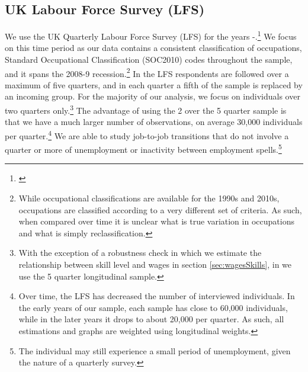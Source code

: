 \documentclass[preprint,12pt,authoryear]{elsarticle}
\begin{document}
\subsection{UK Labour Force Survey (LFS)}
\label{sec:LFS}
We use the UK Quarterly Labour Force Survey (LFS) for the years \hspace{-1mm}-\hspace{5mm}\hspace{-1mm}.\footnote{\cite{LFS}} We focus on this time period as our data contains a consistent classification of occupations, Standard Occupational Classification (SOC2010) codes throughout the sample, and it spans the 2008-9 recession.\footnote{While occupational classifications are available for the 1990s and 2010s, occupations are classified according to a very different set of criteria. As such, when compared over time it is unclear what is true variation in occupations and what is simply reclassification.}  In the LFS respondents are followed over a maximum of five quarters, and in each quarter a fifth of the sample is replaced by an incoming group. For the majority of our analysis, we focus on individuals over two quarters only.\footnote{With the exception of a robustness check in which we estimate the relationship between skill level and wages in section \ref{sec:wagesSkills}, in we use the 5 quarter longitudinal sample.} The advantage of using the 2 over the 5 quarter sample is that we have a much larger number of observations, on average 30,000 individuals per quarter.\footnote{Over time, the LFS has decreased the number of interviewed individuals. In the early years of our sample, each sample has close to 60,000 individuals, while in the later years it drops to about 20,000 per quarter. As such, all estimations and graphs are weighted using longitudinal weights.} We are able to study job-to-job transitions that do not involve a quarter or more of unemployment or inactivity between employment spells.\footnote{The individual may still experience a small period of unemployment, given the nature of a quarterly survey.} 
\end{document}
